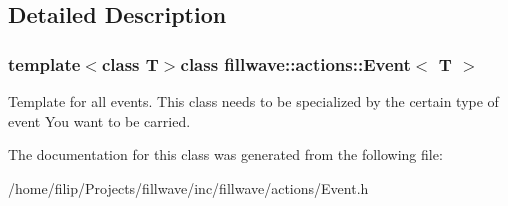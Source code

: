 \subsection{Detailed Description}
\subsubsection*{template$<$class T$>$class fillwave\+::actions\+::\+Event$<$ T $>$}

Template for all events. This class needs to be specialized by the certain type of event You want to be carried. 

The documentation for this class was generated from the following file\+:\begin{DoxyCompactItemize}
\item 
/home/filip/\+Projects/fillwave/inc/fillwave/actions/Event.\+h\end{DoxyCompactItemize}
